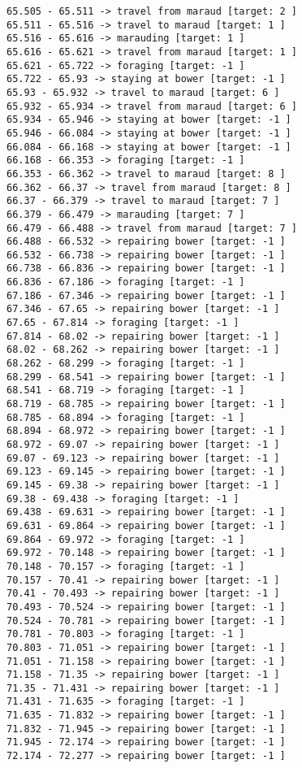 \documentclass[11pt]{article}
\begin{document}
\begin{Verbatim}[commandchars=\\\{\}]
65.505 - 65.511 -> travel from maraud [target: 2 ]
65.511 - 65.516 -> travel to maraud [target: 1 ]
65.516 - 65.616 -> marauding [target: 1 ]
65.616 - 65.621 -> travel from maraud [target: 1 ]
65.621 - 65.722 -> foraging [target: -1 ]
65.722 - 65.93 -> staying at bower [target: -1 ]
65.93 - 65.932 -> travel to maraud [target: 6 ]
65.932 - 65.934 -> travel from maraud [target: 6 ]
65.934 - 65.946 -> staying at bower [target: -1 ]
65.946 - 66.084 -> staying at bower [target: -1 ]
66.084 - 66.168 -> staying at bower [target: -1 ]
66.168 - 66.353 -> foraging [target: -1 ]
66.353 - 66.362 -> travel to maraud [target: 8 ]
66.362 - 66.37 -> travel from maraud [target: 8 ]
66.37 - 66.379 -> travel to maraud [target: 7 ]
66.379 - 66.479 -> marauding [target: 7 ]
66.479 - 66.488 -> travel from maraud [target: 7 ]
66.488 - 66.532 -> repairing bower [target: -1 ]
66.532 - 66.738 -> repairing bower [target: -1 ]
66.738 - 66.836 -> repairing bower [target: -1 ]
66.836 - 67.186 -> foraging [target: -1 ]
67.186 - 67.346 -> repairing bower [target: -1 ]
67.346 - 67.65 -> repairing bower [target: -1 ]
67.65 - 67.814 -> foraging [target: -1 ]
67.814 - 68.02 -> repairing bower [target: -1 ]
68.02 - 68.262 -> repairing bower [target: -1 ]
68.262 - 68.299 -> foraging [target: -1 ]
68.299 - 68.541 -> repairing bower [target: -1 ]
68.541 - 68.719 -> foraging [target: -1 ]
68.719 - 68.785 -> repairing bower [target: -1 ]
68.785 - 68.894 -> foraging [target: -1 ]
68.894 - 68.972 -> repairing bower [target: -1 ]
68.972 - 69.07 -> repairing bower [target: -1 ]
69.07 - 69.123 -> repairing bower [target: -1 ]
69.123 - 69.145 -> repairing bower [target: -1 ]
69.145 - 69.38 -> repairing bower [target: -1 ]
69.38 - 69.438 -> foraging [target: -1 ]
69.438 - 69.631 -> repairing bower [target: -1 ]
69.631 - 69.864 -> repairing bower [target: -1 ]
69.864 - 69.972 -> foraging [target: -1 ]
69.972 - 70.148 -> repairing bower [target: -1 ]
70.148 - 70.157 -> foraging [target: -1 ]
70.157 - 70.41 -> repairing bower [target: -1 ]
70.41 - 70.493 -> repairing bower [target: -1 ]
70.493 - 70.524 -> repairing bower [target: -1 ]
70.524 - 70.781 -> repairing bower [target: -1 ]
70.781 - 70.803 -> foraging [target: -1 ]
70.803 - 71.051 -> repairing bower [target: -1 ]
71.051 - 71.158 -> repairing bower [target: -1 ]
71.158 - 71.35 -> repairing bower [target: -1 ]
71.35 - 71.431 -> repairing bower [target: -1 ]
71.431 - 71.635 -> foraging [target: -1 ]
71.635 - 71.832 -> repairing bower [target: -1 ]
71.832 - 71.945 -> repairing bower [target: -1 ]
71.945 - 72.174 -> repairing bower [target: -1 ]
72.174 - 72.277 -> repairing bower [target: -1 ]

\end{Verbatim}
\end{document}
